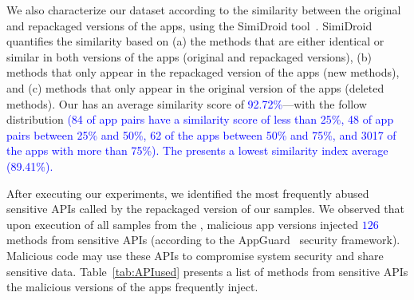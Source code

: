 We also characterize our dataset according to the similarity
between the original and repackaged versions of the apps, using the  
SimiDroid tool~\cite{DBLP:conf/trustcom/0029BK17}. SimiDroid quantifies the similarity
based on (a) the methods that are either identical or similar in both versions of the apps (original and repackaged versions),
(b) methods that only appear in the repackaged version of the apps (new methods), and (c) methods that only appear in the
original version of the apps (deleted methods).
Our \cds has an average similarity score of \textcolor{blue}{92.72\%}---with the follow distribution \textcolor{blue}{(84 of
app pairs have a similarity score of less than 25\%, 48 of app pairs
between 25\% and 50\%,  62 of the apps between 50\% and 75\%,
and 3017 of the apps with more than 75\%). The \sds presents a lowest
similarity index average (89.41\%). }


After executing our experiments, we identified the  most frequently abused sensitive APIs called by the repackaged version of our samples.
We observed that upon execution of all samples from the \cds, malicious app versions injected \textcolor{blue}{$126$} methods from sensitive APIs (according to the
AppGuard~\cite{DBLP:conf/esorics/BackesGHMS13} security framework). Malicious code may use these APIs to compromise system security and
share sensitive data. Table~\ref{tab:APIused} presents a list of methods from sensitive APIs the  malicious versions of the apps
frequently inject.



